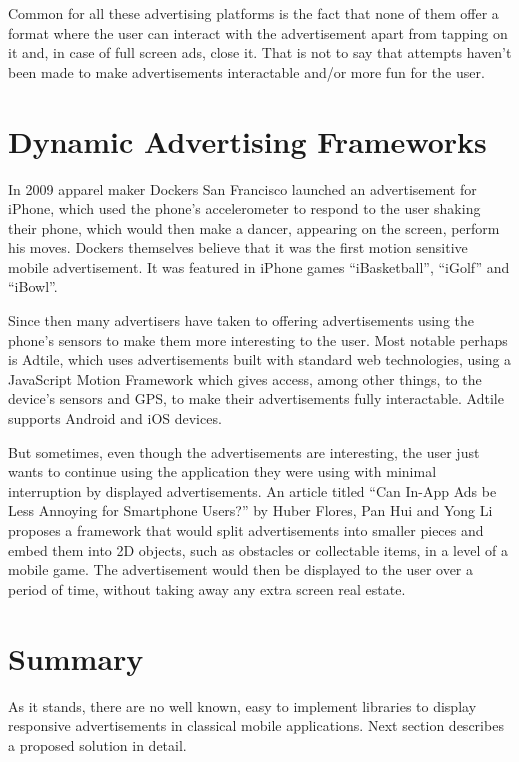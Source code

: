 Common for all these advertising platforms is the fact that none of them offer a format where the user can interact with the advertisement apart from tapping on it and, in case of full screen ads, close it. That is not to say that attempts haven’t been made to make advertisements interactable and/or more fun for the user.

\section{Dynamic Advertising Frameworks}

In 2009 apparel maker Dockers San Francisco launched an advertisement for iPhone, which used the phone’s accelerometer to respond to the user shaking their phone, which would then make a dancer, appearing on the screen, perform his moves. Dockers themselves believe that it was the first motion sensitive mobile advertisement. It was featured in iPhone games “iBasketball”, “iGolf” and “iBowl”.\cite{dockers}

Since then many advertisers have taken to offering advertisements using the phone’s sensors to make them more interesting to the user. Most notable perhaps is Adtile, which uses advertisements built with standard web technologies, using a JavaScript Motion Framework which gives access, among other things, to the device’s sensors and GPS, to make their advertisements fully interactable. Adtile supports Android and iOS devices. \cite{adtile}

But sometimes, even though the advertisements are interesting, the user just wants to continue using the application they were using with minimal interruption by displayed advertisements. An article titled “Can In-App Ads be Less Annoying for Smartphone Users?” by Huber Flores, Pan Hui and Yong Li proposes a framework that would split advertisements into smaller pieces and embed them into 2D objects, such as obstacles or collectable items, in a level of a mobile game. The advertisement would then be displayed to the user over a period of time, without taking away any extra screen real estate. \cite{gesture-ads}

\section{Summary}

As it stands, there are no well known, easy to implement libraries to display responsive advertisements in classical mobile applications. Next section describes a proposed solution in detail.

